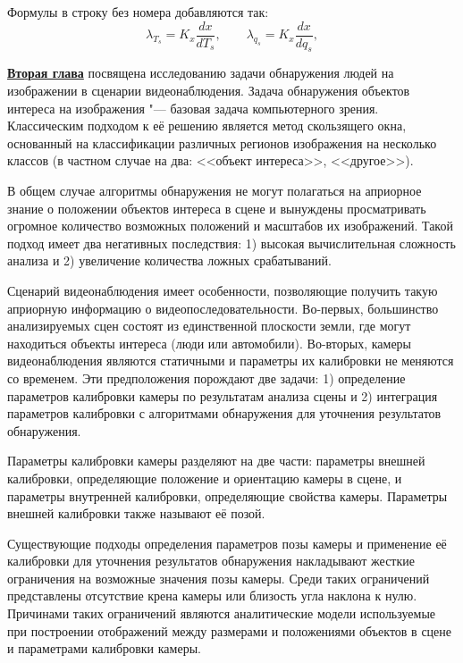 Формулы в строку без номера добавляются так:
\[ 
  \lambda_{T_s} = K_x\frac{d{x}}{d{T_s}}, \qquad
  \lambda_{q_s} = K_x\frac{d{x}}{d{q_s}},
\]

\fi

\underline{\textbf{Вторая глава}} посвящена исследованию задачи обнаружения людей на изображении в сценарии видеонаблюдения. Задача обнаружения объектов интереса на изображения "--- базовая задача компьютерного зрения. Классическим подходом к её решению является метод скользящего окна, основанный на классификации различных регионов изображения на несколько классов (в частном случае на два: <<объект интереса>>, <<другое>>).

В общем случае алгоритмы обнаружения не могут полагаться на априорное знание о положении объектов интереса в сцене и вынуждены просматривать огромное количество возможных положений и масштабов их изображений. Такой подход имеет два негативных последствия: 1) высокая вычислительная сложность анализа и 2) увеличение количества ложных срабатываний.

Сценарий видеонаблюдения имеет особенности, позволяющие получить такую априорную информацию о видеопоследовательности. Во-первых, большинство анализируемых сцен состоят из единственной плоскости земли, где могут находиться объекты интереса (люди или автомобили). Во-вторых, камеры видеонаблюдения являются статичными и параметры их калибровки не меняются со временем. Эти предположения порождают две задачи: 1) определение параметров калибровки камеры по результатам анализа сцены и 2) интеграция параметров калибровки с алгоритмами обнаружения для уточнения результатов обнаружения.

Параметры калибровки камеры разделяют на две части: параметры внешней калибровки, определяющие положение и ориентацию камеры в сцене, и параметры внутренней калибровки, определяющие свойства камеры. Параметры внешней калибровки также называют её позой.

Существующие подходы определения параметров позы камеры и применение её калибровки для уточнения результатов обнаружения накладывают жесткие ограничения на возможные значения позы камеры. Среди таких ограничений представлены отсутствие крена камеры или близость угла наклона к нулю. Причинами таких ограничений являются аналитические модели используемые при построении отображений между размерами и положениями объектов в сцене и параметрами калибровки камеры.

